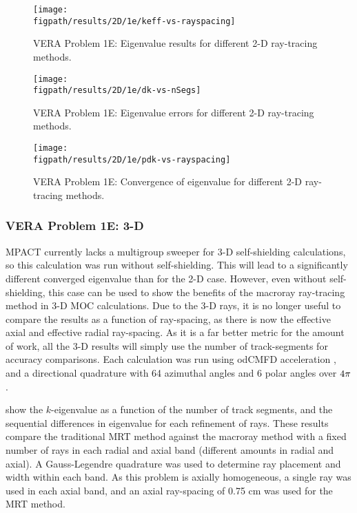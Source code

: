 {{{{        \begin{figure}[hp]
          \centering
          \texttt{[image: \\figpath/results/2D/1e/keff-vs-rayspacing]}
          \caption{VERA Problem 1E: Eigenvalue results for different 2-D ray-tracing methods. \label{fig:MB:1e:keff-vs-rayspacing}}
        \end{figure}
        \begin{figure}[hp]
          \centering
          \texttt{[image: \\figpath/results/2D/1e/dk-vs-nSegs]}
          \caption{VERA Problem 1E: Eigenvalue errors for different 2-D ray-tracing methods. \label{fig:MB:1e:dk-vs-nSegs}}
        \end{figure}
        \begin{figure}[hp]
          \centering
          \texttt{[image: \\figpath/results/2D/1e/pdk-vs-rayspacing]}
          \caption{VERA Problem 1E: Convergence of eigenvalue for different 2-D ray-tracing methods. \label{fig:MB:1e:pdk-vs-rayspacing}}
        \end{figure}
      }

      \subsubsection{VERA Problem 1E: 3-D}{\label{sssec:MR:1E:3-D}
        MPACT currently lacks a multigroup sweeper for 3-D self-shielding calculations, so this calculation was run without self-shielding.
        This will lead to a significantly different converged eigenvalue than for the 2-D case.
        However, even without self-shielding, this case can be used to show the benefits of the macroray ray-tracing method in 3-D \ac{MOC} calculations.
        Due to the 3-D rays, it is no longer useful to compare the results as a function of ray-spacing, as there is now the effective axial and effective radial ray-spacing.
        As it is a far better metric for the amount of work, all the 3-D results will simply use the number of track-segments for accuracy comparisons.
        Each calculation was run using od\ac{CMFD} acceleration \cite{Zhu2016}, and a directional quadrature with 64 azimuthal angles and 6 polar angles over $4\pi$.

         show the $k$-eigenvalue as a function of the number of track segments, and the sequential differences in eigenvalue for each refinement of rays.
        These results compare the traditional \ac{MRT} method against the macroray method with a fixed number of rays in each radial and axial band (different amounts in radial and axial).
        A Gauss-Legendre quadrature was used to determine ray placement and width within each band.
        As this problem is axially homogeneous, a single ray was used in each axial band, and an axial ray-spacing of 0.75 cm was used for the \ac{MRT} method.

}}}}
